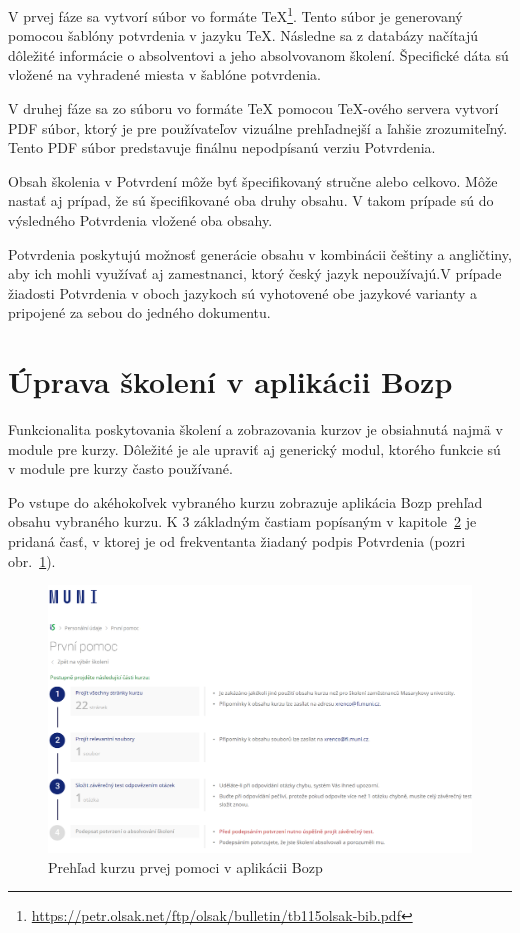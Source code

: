 \documentclass[
  digital,     %
  oneside,     %
  nosansbold,  %
  nocolorbold, %
  lof,         %
  nolot,         %
]{fithesis4}
\begin{document}
V prvej fáze sa vytvorí súbor vo formáte \TeX\footnote{\url{https://petr.olsak.net/ftp/olsak/bulletin/tb115olsak-bib.pdf}}. Tento súbor je generovaný pomocou šablóny potvrdenia v jazyku \TeX. Následne sa z databázy načítajú dôležité informácie o absolventovi a jeho absolvovanom školení. Špecifické dáta sú vložené na vyhradené miesta v šablóne potvrdenia.

V druhej fáze sa zo súboru vo formáte \TeX{} pomocou \TeX-ového servera vytvorí PDF súbor, ktorý je pre používateľov vizuálne prehľadnejší a ľahšie zrozumiteľný. Tento PDF súbor predstavuje finálnu nepodpísanú verziu Potvrdenia.

Obsah školenia v Potvrdení môže byť špecifikovaný stručne alebo celkovo. Môže nastať aj prípad, že sú špecifikované oba druhy obsahu. V takom prípade sú do výsledného Potvrdenia vložené oba obsahy. 

Potvrdenia poskytujú možnosť generácie obsahu v kombinácii češtiny a angličtiny, aby ich mohli využívať aj zamestnanci, ktorý český jazyk nepoužívajú.V prípade žiadosti Potvrdenia v oboch jazykoch sú vyhotovené obe jazykové varianty a pripojené za sebou do jedného dokumentu.

\section{Úprava školení v aplikácii Bozp}
Funkcionalita poskytovania školení a zobrazovania kurzov je obsiahnutá najmä v module pre kurzy. Dôležité je ale upraviť aj generický modul, ktorého funkcie sú v module pre kurzy často používané.

Po vstupe do akéhokoľvek vybraného kurzu zobrazuje aplikácia Bozp prehľad obsahu vybraného kurzu. K 3 základným častiam popísaným v kapitole~\hyperref[kap-2]{2} je pridaná časť, v ktorej je od frekventanta žiadaný podpis Potvrdenia (pozri obr.~\ref{obr1}).

\begin{figure}
  \begin{center}
    \includegraphics[width=\textwidth]{prehledvyberu.png}
  \end{center}
  \caption{Prehľad kurzu prvej pomoci v aplikácii Bozp}
  \label{obr1}
\end{figure}
\end{document}
